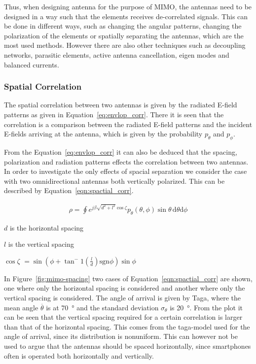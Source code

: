 Thus, when designing antenna for the purpose of MIMO, the antennas need to be designed in a way such that the elements receives de-correlated signals. This can be done in different ways, such as changing the angular patterns, changing the polarization of the elements or spatially separating the antennas, which are the most used methods. However there are also other techniques such as decoupling networks, parasitic elements, active antenna cancellation, eigen modes and balanced currents. 

\subsubsection{Spatial Correlation}
The spatial correlation between two antennas is given by the radiated E-field patterns as given in Equation~\ref{eq:envlop_corr}. There it is seen that the correlation is a comparison between the radiated E-field patterns and the incident E-fields arriving at the antenna, which is given by the probability $p_\theta$ and $p_\phi$. 

From the Equation~\ref{eq:envlop_corr} it can also be deduced that the spacing, polarization and radiation patterns effects the correlation between two antennas. In order to investigate the only effects of spacial separation we consider the case with two omnidirectional antennas both vertically polarized. This can be described by Equation~\ref{eqn:spactial_corr}\cite{Tim2012Practical}.

\begin{align}
\label{eqn:spactial_corr}
  \rho = \oint e^{j\beta \sqrt{d^2+l^2}\cos\zeta}p_\theta(\theta,\phi)\sin\theta \, \mathrm{d} \theta \mathrm{d} \phi
\end{align}
\begin{where}
\item[$d$] is the horizontal spacing
\item[$l$] is the vertical spacing
\item[$\cos \zeta$] $= \sin(\phi + \tan^-1(\frac{l}{d}) \text{sgn}\phi)\sin\phi$   
\end{where}

In Figure~\ref{fig:mimo-spacing} two cases of Equation~\ref{eqn:spactial_corr} are shown, one where only the horizontal spacing is considered and another where only the vertical spacing is considered. The angle of arrival is given by Taga, where the mean angle $\overline{\theta}$ is at \SI{70}{\degree} and the standard deviation $\sigma_\theta$ is \SI{20}{\degree}. From the plot it can be seen that the vertical spacing required for a certain correlation is larger than that of the horizontal spacing. This comes from the taga-model used for the angle of arrival, since its distribution is nonuniform. This can however not be used to argue that the antennas should be spaced horizontally, since smartphones often is operated both horizontally and vertically. 

